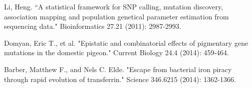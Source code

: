 \documentclass[10pt,letterpaper]{article}
\begin{document}
\begin{thebibliography}{10}
Li, Heng. ``A statistical framework for SNP calling, mutation discovery, association mapping and population genetical parameter estimation from sequencing data." Bioinformatics 27.21 (2011): 2987-2993.

Domyan, Eric T., et al. "Epistatic and combinatorial effects of pigmentary gene mutations in the domestic pigeon." Current Biology 24.4 (2014): 459-464.

Barber, Matthew F., and Nels C. Elde. "Escape from bacterial iron piracy through rapid evolution of transferrin." Science 346.6215 (2014): 1362-1366.

\end{thebibliography}
\end{document}
